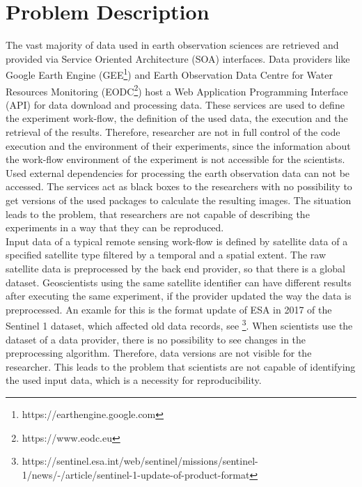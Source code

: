 \documentclass[draft,final]{vutinfth} %
\begin{document}
\section{Problem Description}\label{Problem}
The vast majority of data used in earth observation sciences are retrieved and provided via Service Oriented Architecture (SOA) interfaces. Data providers like Google Earth Engine (GEE\footnote{https://earthengine.google.com}) and Earth Observation Data Centre for Water Resources Monitoring (EODC\footnote{https://www.eodc.eu}) host a Web Application Programming Interface (API) for data download and processing data. These services are used to define the experiment work-flow, the definition of the used data, the execution and the retrieval of the results. Therefore, researcher are not in full control of the code execution and the environment of their experiments, since the information about the work-flow environment of the experiment is not accessible for the scientists. Used external dependencies for processing the earth observation data can not be accessed. The services act as black boxes to the researchers with no possibility to get versions of the used packages to calculate the resulting images. The situation leads to the problem, that researchers are not capable of describing the experiments in a way that they can be reproduced. \\
Input data of a typical remote sensing work-flow is defined by satellite data of a specified satellite type filtered by a temporal and a spatial extent. The raw satellite data is preprocessed by the back end provider, so that there is a global dataset. Geoscientists using the same satellite identifier can have different results after executing the same experiment, if the provider updated the way the data is preprocessed. An examle for this is the format update of ESA in 2017 of the Sentinel 1 dataset, which affected old data records, see \footnote{https://sentinel.esa.int/web/sentinel/missions/sentinel-1/news/-/article/sentinel-1-update-of-product-format}. When scientists use the dataset of a data provider, there is no possibility to see changes in the preprocessing algorithm. Therefore, data versions are not visible for the researcher. This leads to the problem that scientists are not capable of identifying the used input data, which is a necessity for reproducibility. 
\end{document}
